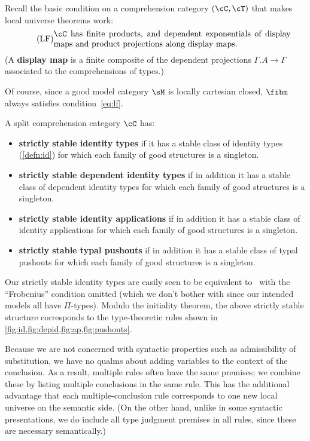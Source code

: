 \documentclass[referee]{psp}
\let\C\cC
\let\T\cT
\begin{document}
Recall the basic condition on a comprehension category $(\C,\T)$ that makes local universe theorems work:
\begin{equation}
  \label{eq:lf}
  \tag{LF} \parbox{10cm}{$\C$ has finite products, and dependent exponentials of display maps and product projections along display maps.}
\end{equation}
(A \textbf{display map} is a finite composite of the dependent projections $\Gamma.A\to\Gamma$ associated to the comprehensions of types.)

Of course, since a good model category $\sM$ is locally cartesian closed, $\fibm$ always satisfies condition~\eqref{eq:lf}.

\begin{defn}
  A split comprehension category $\C$ has:
  \begin{itemize}
  \item \textbf{strictly stable identity types} if it has a stable class of identity types (\cref{defn:id}) for which each family of good structures is a singleton.
  \item \textbf{strictly stable dependent identity types} if in addition it has a stable class of dependent identity types for which each family of good structures is a singleton.
  \item \textbf{strictly stable identity applications} if in addition it has a stable class of identity applications for which each family of good structures is a singleton.
  \item \textbf{strictly stable typal pushouts} if in addition it has a stable class of typal pushouts for which each family of good structures is a singleton.
\end{itemize}
\end{defn}

Our strictly stable identity types are easily seen to be equivalent to~\cite[Definition 3.4.3.1]{lw:localuniv} with the ``Frobenius'' condition omitted (which we don't bother with since our intended models all have $\Pi$-types).
Modulo the initiality theorem, the above strictly stable structure corresponds to the type-theoretic rules shown in \cref{fig:id,fig:depid,fig:ap,fig:pushouts}.

\begin{rmk}\label{rmk:rule-style}
  Because we are not concerned with syntactic properties such as admissibility of substitution, we have no qualms about adding variables to the context of the conclusion.
  As a result, multiple rules often have the same premises; we combine these by listing multiple conclusions in the same rule.
  This has the additional advantage that each multiple-conclusion rule corresponds to one new local universe on the semantic side.
  (On the other hand, unlike in some syntactic presentations, we do include all type judgment premises in all rules, since these are necessary semantically.)
\end{rmk}
\end{document}
